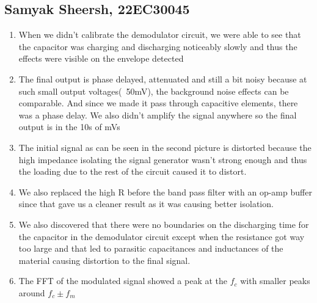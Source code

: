\documentclass{article}
\begin{document}
\subsection{Samyak Sheersh, 22EC30045}
\begin{enumerate}
  \item When we didn't calibrate the demodulator circuit, we were able to see that the capacitor was charging and discharging noticeably slowly and thus the effects were visible on the envelope detected
  \item The final output is phase delayed, attenuated and still a bit noisy because at such small output voltages(~50mV), the background noise effects can be comparable. And since we made it pass through capacitive elements, there was a phase delay. We also didn't amplify the signal anywhere so the final output is in the 10s of mVs
  \item The initial signal as can be seen in the second picture is distorted because the high impedance isolating the signal generator wasn't strong enough and thus the loading due to the rest of the circuit caused it to distort.
  \item We also replaced the high R before the band pass filter with an op-amp buffer since that gave us a cleaner result as it was causing better isolation.
  \item We also discovered that there were no boundaries on the discharging time for the capacitor in the demodulator circuit except when the resistance got way too large and that led to parasitic capacitances and inductances of the material causing distortion to the final signal.
  \item The FFT of the modulated signal showed a peak at the $f_c$ with smaller peaks around $f_c\pm f_m$ 
\end{enumerate}
\end{document}
